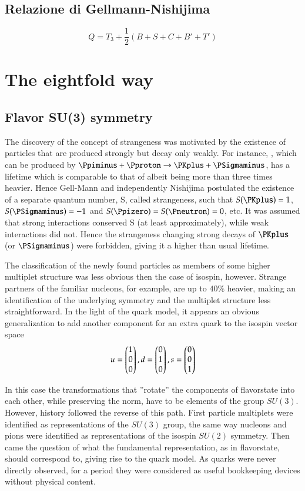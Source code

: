 \documentclass[main.tex]{subfiles}
\begin{document}
\section{Relazione di Gellmann-Nishijima}
\begin{equation*}
Q=T_3+\frac{1}{2}(B+S+C+B'+T')
\end{equation*}

\chapter{The eightfold way}

\section{Flavor SU(3) symmetry}

The discovery of the concept of strangeness was motivated by the existence of particles that are produced strongly but decay only weakly. For instance, \PKplus, which can be produced by $\Ppiminus+\Pproton\rightarrow\PKplus+\PSigmaminus$, has a lifetime which is comparable to that of \Ppiplus albeit being more than three times heavier. Hence Gell-Mann and independently Nishijima postulated the existence of a separate quantum number, S, called strangeness, such that $S(\PKplus)=1$, $S(\PSigmaminus)=-1$ and $S(\Ppizero)=S(\Pneutron)=0$, etc. It was assumed that strong interactions conserved S (at least approximately), while weak interactions did not. Hence the strangeness changing strong decays of $\PKplus$ (or $\PSigmaminus$) were forbidden, giving it a higher than usual lifetime.

The classification of the newly found particles as members of some higher multiplet structure was less obvious then the case of isospin, however. Strange partners of the familiar nucleons, for example, are up to $40\%$ heavier, making an identification of the underlying symmetry and the multiplet structure less straightforward. In the light of the quark model, it appears an obvious generalization to add another component for an extra quark to the isospin vector space
\begin{equation*}
u=\begin{pmatrix}1\\0\\0\end{pmatrix}, d=\begin{pmatrix}0\\1\\0\end{pmatrix}, s=\begin{pmatrix}0\\0\\1\end{pmatrix}
\end{equation*}

In this case the transformations that ''rotate'' the components of flavorstate
into each other, while preserving the norm, have to be elements of the group $SU(3)$. However, history followed the reverse of this path. First particle multiplets were identified as representations of the $SU(3)$ group, the same way nucleons and pions were identified as representations of the isospin $SU(2)$ symmetry. Then came the question of what the fundamental representation, as in  flavorstate, should correspond to, giving rise to the quark model. As quarks were never directly observed, for a period they were considered as useful bookkeeping devices without physical content.
\end{document}
